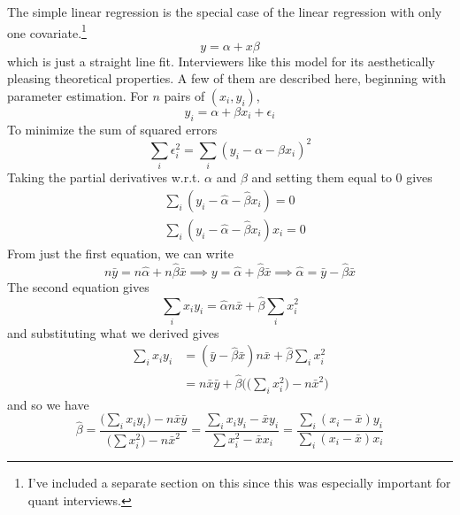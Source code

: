   The simple linear regression is the special case of the linear regression with only one covariate.\footnote{I've included a separate section on this since this was especially important for quant interviews.}
  \begin{equation}
    y = \alpha + x \beta
  \end{equation}
  which is just a straight line fit. Interviewers like this model for its aesthetically pleasing theoretical properties. A few of them are described here, beginning with parameter estimation. For $n$ pairs of $(x_i, y_i)$, 
  \begin{equation}
    y_i = \alpha + \beta x_i + \epsilon_i
  \end{equation}
  To minimize the sum of squared errors 
  \begin{equation}
    \sum_{i} \epsilon_i^2 = \sum_{i} (y_i - \alpha - \beta x_i)^2
  \end{equation}
  Taking the partial derivatives w.r.t. $\alpha$ and $\beta$ and setting them equal to $0$ gives 
  \begin{align*}
    &\sum_i (y_i - \hat{\alpha} - \hat{\beta} x_i) = 0 \\
    &\sum_i (y_i - \hat{\alpha} - \hat{\beta} x_i) x_i = 0
  \end{align*}
  From just the first equation, we can write 
  \begin{equation}
    n \bar{y} = n \hat{\alpha} + n \hat{\beta} \bar{x} \implies y = \hat{\alpha} + \hat{\beta} \bar{x} \implies \hat{\alpha}  = \bar{y} - \hat{\beta} \bar{x} 
  \end{equation}
  The second equation gives 
  \begin{equation}
    \sum_{i} x_i y_i = \hat{\alpha} n \bar{x} + \hat{\beta} \sum_{i} x_i^2
  \end{equation}
  and substituting what we derived gives 
  \begin{align*}
    \sum_{i} x_i y_i & = (\bar{y} - \hat{\beta} \bar{x}) n \bar{x} + \hat{\beta} \sum_i x_i^2 \\
    & = n \bar{x} \bar{y} + \hat{\beta} \bigg( \Big(\sum_i x_i^2 \Big) - n \bar{x}^2 \bigg)
  \end{align*}
  and so we have 
  \begin{equation}
    \hat{\beta} = \frac{ \big( \sum_i x_i y_i \big) - n \bar{x}\bar{y}}{\big( \sum x_i^2 \big) - n \bar{x}^2} = \frac{ \sum_i x_i y_i - \bar{x} y_i}{\sum x_i^2 - \bar{x} x_i} = \frac{ \sum_i (x_i - \bar{x}) y_i}{\sum_i (x_i - \bar{x}) x_i}
  \end{equation}
